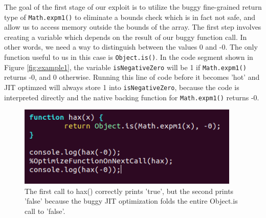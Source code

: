 \documentclass[11pt]{article}
\begin{document}
The goal of the first stage of our exploit is to utilize the buggy fine-grained return type of
\texttt{Math.expm1()} to eliminate a bounds check which is in fact not safe, and allow us to access
memory outside the bounds of the array. The first step involves creating a variable which depends on
the result of our buggy function call. In other words, we need a way to distinguish between the
values 0 and -0. The only function useful to us in this case is \texttt{Object.is()}. In the code
segment shown in Figure \ref{fig:example1}, the variable \texttt{isNegativeZero} will be 1 if
\texttt{Math.expm1()} returns -0, and 0 otherwise. Running this line of code before it becomes 'hot'
and JIT optimzed will always store 1 into \texttt{isNegativeZero}, because the code is interpreted
directly and the native backing function for \texttt{Math.expm1()} returns -0. 

\begin{figure}
	\centering
	\includegraphics[width=300pt]{example2.png}
	\caption{The first call to hax() correctly prints 'true', but the second prints 'false' because the buggy JIT optimization folds the entire Object.is call to 'false'.}
  \label{fig:example2}
\end{figure}
\end{document}
